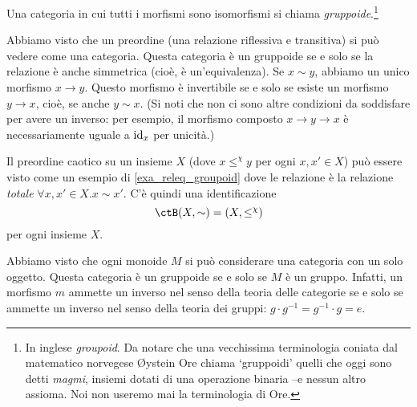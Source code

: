 \begin{definition}[Gruppoide]\label{def_gruppoide}
	Una categoria in cui tutti i morfismi sono isomorfismi si chiama \emph{gruppoide}.\footnote{In inglese \emph{groupoid}. Da notare che una vecchissima terminologia coniata dal matematico norvegese Øystein Ore chiama `gruppoidi' quelli che oggi sono detti \emph{magmi}, insiemi dotati di una operazione binaria --e nessun altro assioma. Noi non useremo mai la terminologia di Ore.}
\end{definition}
\begin{example}\label{exa_releq_groupoid}
	Abbiamo visto che un preordine (una relazione riflessiva e transitiva) si può vedere come una categoria. Questa categoria è un gruppoide se e solo se la relazione è anche simmetrica (cioè, è un'equivalenza). Se \(x\sim y\), abbiamo un unico morfismo \(x\to y\). Questo morfismo è invertibile se e solo se esiste un morfismo \(y\to x\), cioè, se anche \(y\sim x\). (Si noti che non ci sono altre condizioni da soddisfare per avere un inverso: per esempio, il morfismo composto \(x\to y\to x\) è necessariamente uguale a \(\mathrm{id}_x\) per unicità.)
\end{example}
\begin{remark}
	Il preordine caotico su un insieme \(X\) (dove \(x\mathrel{\le^\chi} y\) per ogni \(x,x'\in X\)) può essere visto come un esempio di \ref{exa_releq_groupoid} dove le relazione è la relazione \emph{totale} \(\forall x,x'\in X.x\sim x'\). C'è quindi una identificazione
	\[\ctB(X,\sim) = (X,\le^\chi)\]
	per ogni insieme \(X\).
\end{remark}
\begin{example}\label{exa_grp_groupoid}
	Abbiamo visto che ogni monoide \(M\) si può considerare una categoria con un solo oggetto. Questa categoria è un gruppoide se e solo se \(M\) è un gruppo. Infatti, un morfismo \(m\) ammette un inverso nel senso della teoria delle categorie se e solo se ammette un inverso nel senso della teoria dei gruppi: \(g\cdot g^{-1}=g^{-1}\cdot g = e\).
\end{example}
